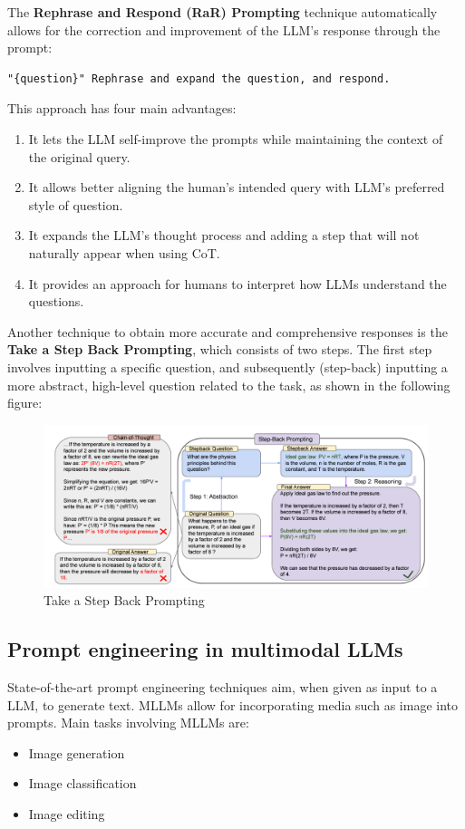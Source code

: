 The \textbf{Rephrase and Respond (RaR) Prompting}\cite{deng2023rephrase} technique automatically allows for the correction and improvement of the LLM's response through the prompt:
\begin{lstlisting}
"{question}" Rephrase and expand the question, and respond.
\end{lstlisting}
This approach has four main advantages:
\begin{enumerate}
    \item It lets the LLM self-improve the prompts while maintaining the context of the original query.

    \item It allows better aligning the human’s intended query with LLM’s preferred style of question.

    \item It expands the LLM’s thought process and adding a step that will not naturally appear when using CoT.

    \item It provides an approach for humans to interpret how LLMs understand the questions.
\end{enumerate}
Another technique to obtain more accurate and comprehensive responses is the \textbf{Take a Step Back Prompting}\cite{zheng2023take}, which consists of two steps. The first step involves inputting a specific question, and subsequently (step-back) inputting a more abstract, high-level question related to the task, as shown in the following figure:
\begin{figure}[H]
    \centering
    \includegraphics[width=0.9\linewidth]{Figures/fig_9.png}
    \caption{Take a Step Back Prompting}
    \label{fig:9}
\end{figure}

\subsection{Prompt engineering in multimodal LLMs}
State-of-the-art prompt engineering techniques aim, when given as input to a LLM, to generate text.
MLLMs allow for incorporating media such as image into prompts.
Main tasks involving MLLMs are:
\begin{itemize}
    \item Image generation
    \item Image classification
    \item Image editing
\end{itemize}

